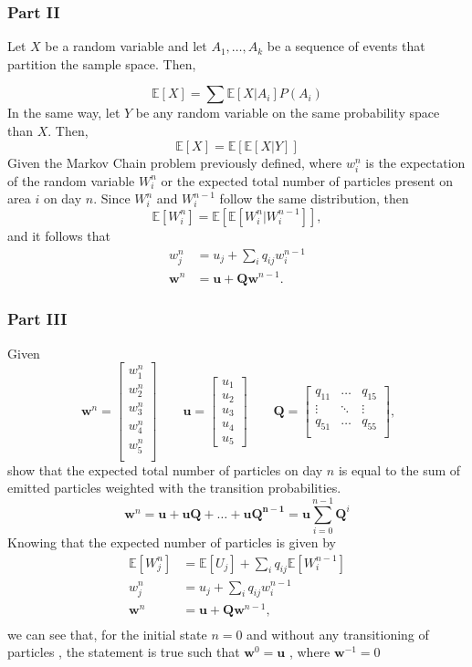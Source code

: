 \documentclass[11pt, a4paper]{article}
\begin{document}
\subsubsection*{Part II}
Let $X$ be a random variable and let $A_1, \dots, A_k$ be a sequence of events that partition the sample space. Then, 

\[
\mathbb{E}[X] = \sum \mathbb{E}[X|A_i]P(A_i)
\]
In the same way, let $Y$ be any random variable on the same probability space than $X$. Then,
\[
\mathbb{E}[X] = \mathbb{E}[\mathbb{E}[X|Y]]
\]
Given the Markov Chain problem previously defined, where $w_i^n$ is the expectation of the random variable $W_i^n$ or the expected total number of particles present on area $i$ on day $n$. 
Since $W_i^n$ and $W_i^{n-1}$ follow the same distribution, then
\[
\mathbb{E}[W_i^n] = \mathbb{E}[\mathbb{E}[W_i^n | W_i^{n-1}]],
\]
and it follows that
\[
\begin{aligned}
w_j^n &= u_j + \sum_i q_{ij}w_i^{n-1} \\
\mathbf w^n &= \mathbf u + \mathbf Q\mathbf w^{n-1}. 
\end{aligned}
\]

\subsubsection{Part III}
Given 
\[\
\mathbf w^n = \begin{bmatrix}w_1^n\\w_2^n\\w_3^n\\w_4^n\\w_5^n \\ \end{bmatrix} 
\qquad
\mathbf u = \begin{bmatrix}u_1\\u_2\\u_3\\u_4\\u_5\end{bmatrix} \qquad 
\mathbf Q = \begin{bmatrix}q_{11} & \dots & q_{15}  \\ 
\vdots & \ddots & \vdots  \\
q_{51} & \dots & q_{55}  \\

\end{bmatrix},
\]
show that the expected total number of particles on day $n$ is equal to the sum of emitted particles weighted with the transition probabilities.
\[
\mathbf{w}^n = \mathbf u + \mathbf{uQ} + \dots + \mathbf{uQ^{n-1}} = \mathbf u\sum_{i=0}^{n-1} \mathbf Q^i
\]
Knowing that the expected number of particles is given by
\[
\begin{aligned}
\mathbb{E}[W_j^n] &= \mathbb{E}[U_j] + \sum_i q_{ij}\mathbb{E}[W_i^{n-1}] \\
w_j^n &= u_j + \sum_i q_{ij}w_i^{n-1} \\
\mathbf w^n &= \mathbf u + \mathbf Q\mathbf w^{n-1}, \\
\end{aligned}
\]
we can see that, for the initial state $n=0$ and without any transitioning of particles , the statement is true such that $\mathbf w^0 = \mathbf u$ , where $\mathbf w^{-1} = 0$
\end{document}
